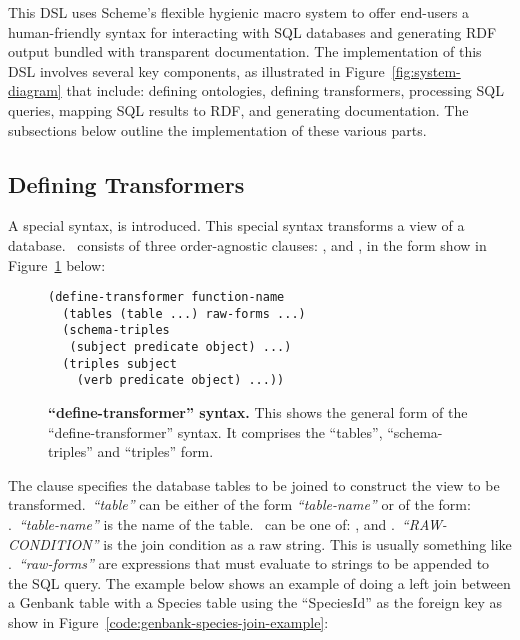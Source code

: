 This DSL uses Scheme's flexible hygienic macro system to offer end-users a human-friendly syntax for interacting with SQL databases and generating RDF output bundled with transparent documentation.  The implementation of this DSL involves several key components, as illustrated in Figure~\ref{fig:system-diagram} that include: defining ontologies, defining transformers, processing SQL queries, mapping SQL results to RDF, and generating documentation.  The subsections below outline the implementation of these various parts.

\subsection{Defining Transformers}

A special syntax,  is introduced.  This special syntax transforms a view of a database.\    consists of three order-agnostic clauses: ,  and , in the form show in Figure~\ref{code:define-transformer-syntax} below:

\begin{figure}[H]
\centering
\begin{verbatim}
(define-transformer function-name
  (tables (table ...) raw-forms ...)
  (schema-triples
   (subject predicate object) ...)
  (triples subject
    (verb predicate object) ...))
\end{verbatim}
\caption[\textit{``define-transformer''} special form]{\textbf{``define-transformer'' syntax.}  This shows the general form of the ``define-transformer'' syntax.  It comprises the ``tables'', ``schema-triples'' and ``triples'' form.}\label{code:define-transformer-syntax}
\end{figure}

The  clause specifies the database tables to be joined to construct the view to be transformed.\   \textit{``table''} can be either of the form \textit{``table-name''} or of the form: .\   \textit{``table-name''} is the name of the table.\    can be one of: ,  and .\   \textit{``RAW-CONDITION''} is the join condition as a raw string.  This is usually something like .\   \textit{``raw-forms''} are expressions that must evaluate to strings to be appended to the SQL query.  The example below shows an example of doing a left join between a Genbank table with a Species table using the ``SpeciesId'' as the foreign key as show in Figure~\ref{code:genbank-species-join-example}:

